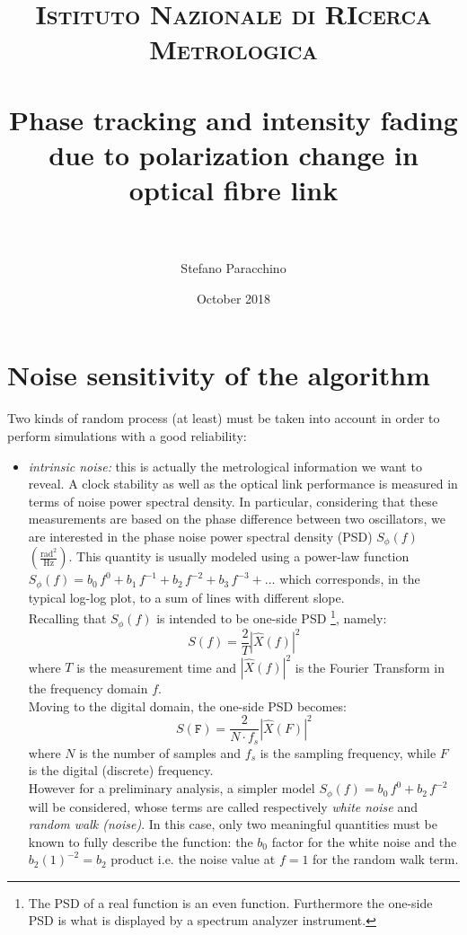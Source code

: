 \documentclass[ fontsize=11pt]{scrartcl} %
\title{	
\normalfont \normalsize 
\textsc{Istituto Nazionale di RIcerca Metrologica } \\ [10pt]
\horrule{0.7pt} \\[0.4cm] %
\huge Phase tracking and intensity fading due to polarization change in optical fibre link \\ %
\horrule{3pt} \\[0.5cm] %
}
\author{Stefano Paracchino} %
\date{October 2018} %
\numberwithin{equation}{section} %
\numberwithin{figure}{section} %
\numberwithin{table}{section} %
\begin{document}
\maketitle
\tableofcontents 
\pagebreak

\section{Noise sensitivity of the algorithm}

Two kinds of random process  (at least)  must be taken into account in order to perform simulations with a good reliability:

\begin{itemize}
\item \textsl{intrinsic noise:} this is actually the metrological information we want to reveal. A clock stability as well as the optical link performance is measured in terms of noise power spectral density. In particular, considering that these measurements are based on the phase difference between two oscillators, we are interested in the phase noise power spectral density (PSD) $S_{\phi}(f)$ $\left(\frac{\text{rad}^2}{\text{Hz}}\right)$.
This quantity is usually modeled using a power-law function $S_{\phi}(f)=b_0 \, f^{0} + b_1 \, f^{-1}+ b_2 \, f^{-2}+ b_3 \, f^{-3}+...$ which corresponds, in the typical log-log plot, to a sum of lines with different slope.\\
Recalling that $S_{\phi}(f)$ is intended to be one-side PSD \footnote{The PSD of a real function is an even function. Furthermore the one-side PSD is what is displayed by a spectrum analyzer instrument.}, namely:
\begin{equation}
S(f)=\frac{2}{T}\left|\hat{X}(f)\right|^2
\end{equation}
where $T$ is the measurement time and $\left|\hat{X}(f)\right|^2$ is the Fourier Transform in the frequency domain $f$. \\
Moving to the digital domain, the one-side PSD becomes:
\begin{equation}
S(\mathtt{F})=\frac{2}{N\cdot f_s}\left|\hat{X}(F)\right|^2
\end{equation}
where $N$ is the number of samples and $f_s$ is the sampling frequency, while $F$ is the digital (discrete) frequency.\\
However for a preliminary analysis, a simpler model $S_{\phi}(f)=b_0 \, f^{0} + b_2 \, f^{-2}$ will be considered, whose terms are called respectively \textit{white noise}  and \textit{random walk (noise)}.  In this case, only two meaningful quantities must be known to fully describe the function: the $b_0$ factor for the white noise and the $b_2(1)^{-2}=b_2$ product i.e. the noise value at $f=1$ for the random walk term.


\end{itemize}
\end{document}
